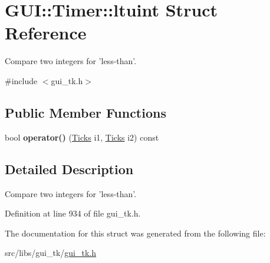 \hypertarget{structGUI_1_1Timer_1_1ltuint}{\section{G\-U\-I\-:\-:Timer\-:\-:ltuint Struct Reference}
\label{structGUI_1_1Timer_1_1ltuint}
}


Compare two integers for 'less-\/than'.  




{\ttfamily \#include $<$gui\-\_\-tk.\-h$>$}

\subsection*{Public Member Functions}
\begin{DoxyCompactItemize}
\item 
\hypertarget{structGUI_1_1Timer_1_1ltuint_ac812e7336225709928959fdd35632405}{bool {\bfseries operator()} (\hyperlink{namespaceGUI_af396fee5d5c26b98218f5803f85e3b65}{Ticks} i1, \hyperlink{namespaceGUI_af396fee5d5c26b98218f5803f85e3b65}{Ticks} i2) const }\label{structGUI_1_1Timer_1_1ltuint_ac812e7336225709928959fdd35632405}

\end{DoxyCompactItemize}


\subsection{Detailed Description}
Compare two integers for 'less-\/than'. 

Definition at line 934 of file gui\-\_\-tk.\-h.



The documentation for this struct was generated from the following file\-:\begin{DoxyCompactItemize}
\item 
src/libs/gui\-\_\-tk/\hyperlink{gui__tk_8h}{gui\-\_\-tk.\-h}\end{DoxyCompactItemize}
